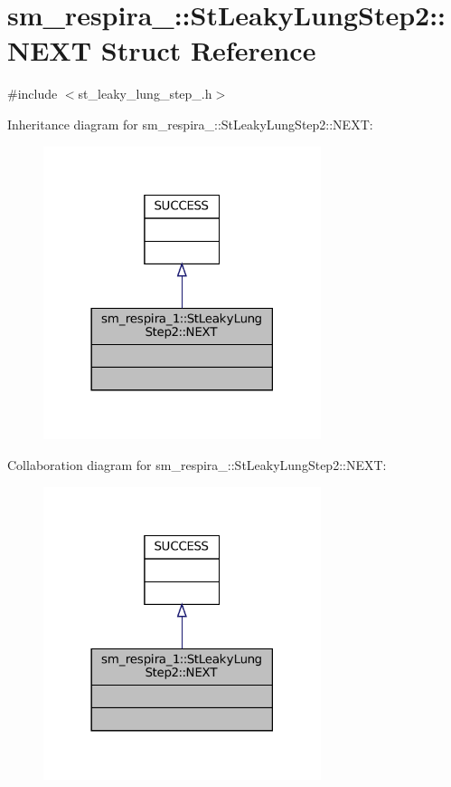 \hypertarget{structsm__respira__1_1_1StLeakyLungStep2_1_1NEXT}{}\section{sm\+\_\+respira\+\_\+:\+:St\+Leaky\+Lung\+Step2\+:\+:N\+E\+XT Struct Reference}
\label{structsm__respira__1_1_1StLeakyLungStep2_1_1NEXT}


{\ttfamily \#include $<$st\+\_\+leaky\+\_\+lung\+\_\+step\+\_.\+h$>$}



Inheritance diagram for sm\+\_\+respira\+\_\+:\+:St\+Leaky\+Lung\+Step2\+:\+:N\+E\+XT\+:
\nopagebreak
\begin{figure}[H]
\begin{center}
\leavevmode
\includegraphics[width=230pt]{structsm__respira__1_1_1StLeakyLungStep2_1_1NEXT__inherit__graph}
\end{center}
\end{figure}


Collaboration diagram for sm\+\_\+respira\+\_\+:\+:St\+Leaky\+Lung\+Step2\+:\+:N\+E\+XT\+:
\nopagebreak
\begin{figure}[H]
\begin{center}
\leavevmode
\includegraphics[width=230pt]{structsm__respira__1_1_1StLeakyLungStep2_1_1NEXT__coll__graph}
\end{center}
\end{figure}


